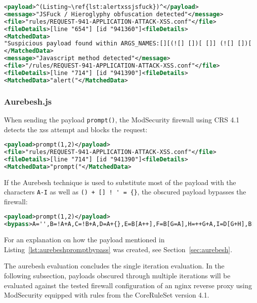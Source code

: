 \begin{lstlisting}[style=ruleStyle, language=XML, caption=alert('XSS') in JSFuck blocked, label={lst:alertxssjsfuckblocked}]
<payload>^(Listing~\ref{lst:alertxssjsfuck})^</payload>
<message>"JSFuck / Hieroglyphy obfuscation detected"</message>
<file>"rules/REQUEST-941-APPLICATION-ATTACK-XSS.conf"</file>
<fileDetails>[line "654"] [id "941360"]<fileDetails>
<MatchedData>
"Suspicious payload found within ARGS_NAMES:[][(![] [])[ []] (![] [])[! [] ! []] (![] [])[ ! []] (!![] [])[ []]][([][(![] [])[ []] (![] [])[! [] ! []] (![] [])[ ! []] (!![] [])[ []]] [])[ (11337 characters omitted)"
</MatchedData>
<message>"Javascript method detected"</message>
<file>"/rules/REQUEST-941-APPLICATION-ATTACK-XSS.conf"</file>
<fileDetails>[line "714"] [id "941390"]<fileDetails>
<MatchedData>"alert("</MatchedData>
\end{lstlisting}


\subsubsection{Aurebesh.js}
\label{sec:aurebeshevaluation}
When sending the payload \verb|prompt()|, the ModSecurity firewall using CRS 4.1 detects the \gls{xss} attempt and blocks the request:
\begin{lstlisting}[style=ruleStyle, language=XML, caption=prompt(1\,2) blocked, label=lst:promptblocked]
<payload>prompt(1,2)</payload>
<file>"rules/REQUEST-941-APPLICATION-ATTACK-XSS.conf"</file>
<fileDetails>[line "714"] [id "941390"]<fileDetails>
<MatchedData>"prompt("</MatchedData>
\end{lstlisting}
If the Aurebesh technique is used to substitute most of the payload with the characters \verb|A-I| as well as \verb|() + [] ! ' = {}|, the obscured payload bypasses the firewall:
\begin{lstlisting}[style=ruleStyle, language=XML, caption=Aurebesh prompt bypass, label=lst:aurebeshpromptbypass]
<payload>prompt(1,2)</payload>
<bypass>A='',B=!A+A,C=!B+A,D=A+{},E=B[A++],F=B[G=A],H=++G+A,I=D[G+H],B[I+=D[A]+(B.C+D)[A]+C[H]+E+F+B[G]+I+E+D[A]+F][I]('p'+F+D[A]+'m'+'p'+E+'(A,++A)')()</bypass>
\end{lstlisting}

For an explanation on how the payload mentioned in Listing~\ref{lst:aurebeshpromptbypass} was created, see Section~\ref{sec:aurebesh}.

The aurebesh evaluation concludes the single iteration evaluation. In the following subsection, payloads obscured through multiple iterations will be evaluated against the tested firewall configuration of an nginx reverse proxy using ModSecurity equipped with rules from the CoreRuleSet version 4.1.


